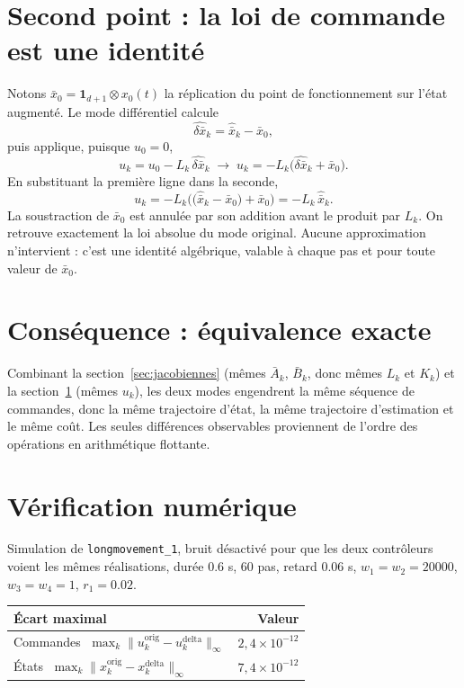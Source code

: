 \documentclass[11pt,a4paper]{article}
\begin{document}
\section{Second point : la loi de commande est une identité}
\label{sec:identite}
Notons $\bar x_0=\mathbf{1}_{d+1}\otimes x_0(t)$ la réplication du point de fonctionnement sur
l'état augmenté. Le mode différentiel calcule
\[
 \widehat{\delta\bar x}_k=\hat{\bar x}_k-\bar x_0 ,
\]
puis applique, puisque $u_0=0$,
\[
 u_k=u_0-L_k\,\widehat{\delta\bar x}_k
   \;\longrightarrow\;
 u_k=-L_k\big(\widehat{\delta\bar x}_k+\bar x_0\big).
\]
En substituant la première ligne dans la seconde,
\[
 u_k=-L_k\Big(\big(\hat{\bar x}_k-\bar x_0\big)+\bar x_0\Big)=-L_k\,\hat{\bar x}_k .
\]
La soustraction de $\bar x_0$ est annulée par son addition avant le produit par $L_k$. On
retrouve exactement la loi absolue du mode original. Aucune approximation n'intervient : c'est
une identité algébrique, valable à chaque pas et pour toute valeur de $\bar x_0$.

\section{Conséquence : équivalence exacte}
Combinant la section~\ref{sec:jacobiennes} (mêmes $\bar A_k$, $\bar B_k$, donc mêmes $L_k$ et
$K_k$) et la section~\ref{sec:identite} (mêmes $u_k$), les deux modes engendrent la même
séquence de commandes, donc la même trajectoire d'état, la même trajectoire d'estimation et le
même coût. Les seules différences observables proviennent de l'ordre des opérations en
arithmétique flottante.

\section{Vérification numérique}
Simulation de \texttt{longmovement\_1}, bruit désactivé pour que les deux contrôleurs voient
les mêmes réalisations, durée $0.6$ s, $60$ pas, retard $0.06$ s, $w_1=w_2=20000$,
$w_3=w_4=1$, $r_1=0.02$.

\begin{center}
\begin{tabular}{lr}
\toprule
Écart maximal & Valeur \\
\midrule
Commandes $\;\max_k\lVert u_k^{\text{orig}}-u_k^{\text{delta}}\rVert_\infty$ & $2{,}4\times10^{-12}$ \\
États $\;\max_k\lVert x_k^{\text{orig}}-x_k^{\text{delta}}\rVert_\infty$ & $7{,}4\times10^{-12}$ \\
\bottomrule
\end{tabular}
\end{center}
\end{document}
